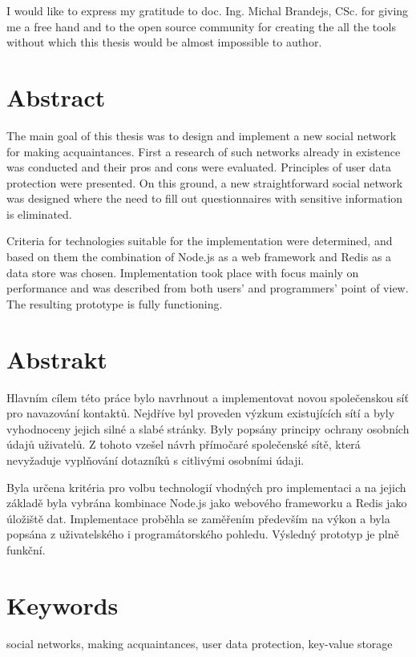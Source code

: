 \documentclass[12pt,oneside]{fithesis}
\begin{document}
\FrontMatter
\ThesisTitlePage


\begin{ThesisDeclaration}
\DeclarationText
\AdvisorName
\end{ThesisDeclaration}

\begin{ThesisThanks}
I would like to express my gratitude to doc. Ing. Michal Brandejs, CSc. for giving me a free hand and to the open source community for creating the all the tools without which this thesis would be almost impossible to author.
\end{ThesisThanks}

\section*{Abstract}
	The main goal of this thesis was to design and implement a new social network for making acquaintances. First a research of such networks already in existence was conducted and their pros and cons were evaluated. Principles of user data protection were presented. On this ground, a new straightforward social network was designed where the need to fill out questionnaires with sensitive information is eliminated.
	
	Criteria for technologies suitable for the implementation were determined, and based on them the combination of Node.js as a web framework and Redis as a data store was chosen. Implementation took place with focus mainly on performance and was described from both users' and programmers' point of view. The resulting prototype is fully functioning.
\section*{Abstrakt}
	Hlavním cílem této práce bylo navrhnout a implementovat novou společenskou síť pro navazování kontaktů. Nejdříve byl proveden výzkum existujících sítí a byly vyhodnoceny jejich silné a slabé stránky.  Byly popsány principy ochrany osobních údajů uživatelů. Z tohoto vzešel návrh přímočaré společenské sítě, která nevyžaduje vyplňování dotazníků s citlivými osobními údaji.
	
	Byla určena kritéria pro volbu technologií vhodných pro implementaci a na jejich základě byla vybrána kombinace Node.js jako webového frameworku a Redis jako úložiště dat. Implementace proběhla se zaměřením především na výkon a byla popsána z uživatelského i programátorského pohledu. Výsledný prototyp je plně funkční.
\section*{Keywords}
social networks, making acquaintances, user data protection, key-value storage
\end{document}
